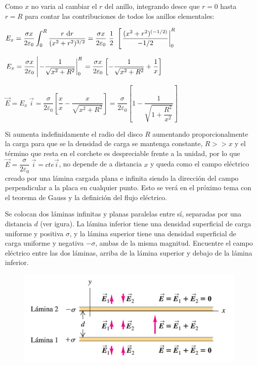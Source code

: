 Como $x$ no varia al cambiar el $r$ del anillo, integrando desce que $r=0$ hasta $r=R$ para contar las contribuciones de todos los anillos elementales:

$\displaystyle E_x= \dfrac{\sigma x}{2\varepsilon_0}\int_0^R \dfrac{r\ \dd r}{(x^2+r^2)^{3/2}}=\dfrac{\sigma x}{2\varepsilon_0} \ \dfrac 1 2 \ \left[ \eval{ \dfrac{(x^2+r^2)^{(-1/2)}}{-1/2} }_0^R \right.$

$E_x=\displaystyle
\dfrac{\sigma x}{2 \varepsilon_0} \left| \eval{-\dfrac 1 {\sqrt{x^2+R^2}}}_0^R \right.= \dfrac {\sigma x}{2\varepsilon_0} \left[ -\dfrac{1}{\sqrt{x^2+R^2}}+\dfrac 1 x \right]$

$\vec E=E_x\ \vec i = \dfrac{\sigma}{2\varepsilon_0} \left[ \dfrac x x - \dfrac x{\sqrt{x^2+R^2}}\right]= \dfrac{\sigma}{2\varepsilon_0} \left[ 1-\dfrac 1{\sqrt{1+ \dfrac {R^2}{x^2}}} \right]$


Si aumenta indefinidamente el radio del disco $R$ aumentando proporcionalmente la carga para que se la densidad de carga se mantenga constante, $R>>x$ y el término que resta en el corchete es despreciable frente a la unidad, por lo que $\vec E=\dfrac{\sigma}{2	\varepsilon_0}\ \vec i=cte \vec i$, no depende de a distancia $x$ y queda como el campo eléctrico creado por una lámina cargada plana e infinita siendo la dirección del campo perpendicular a la placa en cualquier punto. \textcolor{gris}{Esto se verá en el próximo tema con el teorema de Gauss y la definición del flujo eléctrico.}

\begin{prob}
Se colocan dos láminas infinitas y planas paralelas entre sí, separadas por una distancia $d$ (ver igura). La lámina inferior tiene una densidad superficial de carga uniforme y positiva $\sigma$, y la lámina superior tiene una densidad superficial de carga uniforme y negativa $-\sigma$, ambas de la misma magnitud. Encuentre el campo eléctrico entre las dos láminas, arriba de la lámina superior y debajo de la lámina inferior.	
\end{prob}
\begin{figure}[H]
	\centering
	\includegraphics[width=.8\textwidth]{imagenes/imagenes22/T22IM24.png}
\end{figure}

